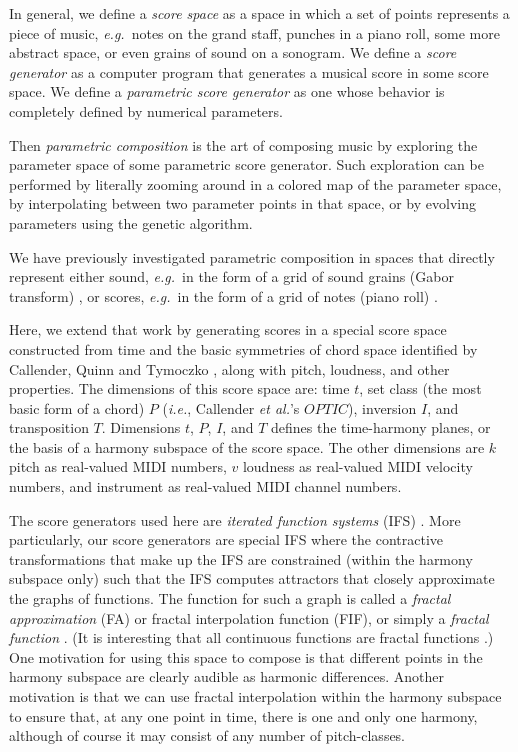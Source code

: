 \documentclass[english,11pt,letterpaper,onecolumn]{scrartcl}
\numberwithin{equation}{section}
\begin{document}
In general, we define a \textit{score space} as a space in which a set of points
represents a piece of music, \textit{e.g.}\ notes on the grand staff, punches in
a piano roll, some more abstract space, or even grains of sound on a sonogram.
We define a \textit{score generator} as a computer program that generates a
musical score in some score space. We define a \textit{parametric score
generator} as one whose behavior is completely defined by numerical parameters.

Then \textit{parametric composition} is the art of composing music by exploring
the parameter space of some parametric score generator. Such exploration can be
performed by literally zooming around in a colored map of the parameter space,
by interpolating between two parameter points in that space, or by evolving
parameters using the genetic algorithm.

We have previously investigated parametric composition in spaces that directly
represent either sound, \textit{e.g.}\ in the form of a grid of sound grains
(Gabor transform) \cite{obsessed}, or scores, \textit{e.g.}\ in the form of a
grid of notes (piano roll) \cite{ifsmusic}.

Here, we extend that work by generating scores in a special score space
constructed from time and the basic symmetries of chord space identified by
Callender, Quinn and Tymoczko \cite{callender:346}, along with pitch, loudness,
and other properties. The dimensions of this score space are: time $t$, set
class (the most basic form of a chord) $P$ (\textit{i.e.}, Callender \textit{et
al.}'s $OPTIC$), inversion $I$, and transposition $T$. Dimensions $t$, $P$, $I$,
and $T$ defines the time-harmony planes, or the basis of a harmony subspace of
the score space. The other dimensions are $k$ pitch as real-valued MIDI numbers,
$v$ loudness as real-valued MIDI velocity numbers, and instrument as real-valued
MIDI channel numbers.

The score generators used here are \textit{iterated function systems} (IFS)
\cite{barnsley1985iterated, 10.2307/24893080, fractalseverywhere}. More
particularly, our score generators are special IFS where the contractive
transformations that make up the IFS are constrained (within the harmony
subspace only) such that the IFS computes attractors that closely approximate
the graphs of functions. The function for such a graph is called a
\textit{fractal approximation} (FA) or fractal interpolation function (FIF), or
simply a \textit{fractal function} \cite{Barnsley1986, fractalseverywhere,
navascues2014fractal}. (It is interesting that all continuous functions are
fractal functions \cite{2016arXiv161001369B}.) One motivation for using this
space to compose is that different points in the harmony subspace are clearly
audible as harmonic differences. Another motivation is that we can use fractal
interpolation within the harmony subspace to ensure that, at any one point in
time, there is one and only one harmony, although of course it may consist of
any number of pitch-classes.
\end{document}
